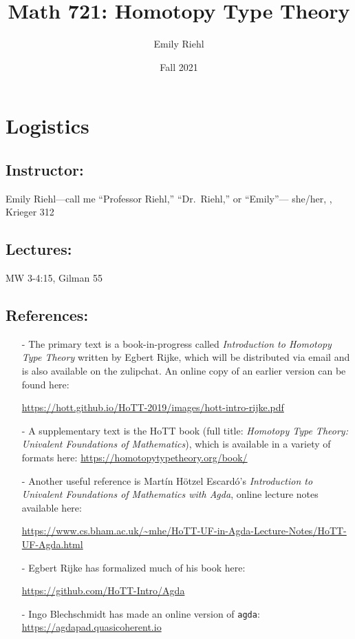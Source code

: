 \documentclass{amsart}
\title{Math 721: Homotopy Type Theory}
\author{Emily Riehl}
\theoremstyle{definition}
\theoremstyle{remark}
\numberwithin{equation}{section}
\begin{document}
\date{Fall 2021}


\address{Dept.~of Mathematics\\Johns Hopkins Univ.\\ 3400 N.~Charles Street \\ Baltimore, MD 21218}


\maketitle


\section*{Logistics}

\subsection*{Instructor:} 
 Emily Riehl---call me ``Professor Riehl,'' ``Dr.~Riehl,'' or ``Emily''--- she/her, , Krieger 312


 \subsection*{Lectures:}   MW 3-4:15, Gilman 55
\subsection*{References:} 
\begin{itemize}
\item[-] The primary text is a book-in-progress called \emph{Introduction to Homotopy Type Theory} written by Egbert Rijke, which will be distributed via email and is also available on the zulipchat. An online copy of an earlier version can be found here: \begin{flushright} \url{https://hott.github.io/HoTT-2019/images/hott-intro-rijke.pdf}\end{flushright}
\item[-] A supplementary text is the HoTT book (full title: \emph{Homotopy Type Theory: Univalent Foundations of Mathematics}), which is available in a variety of formats here: \hfill \url{https://homotopytypetheory.org/book/}
\item[-] Another useful reference is Mart\'{i}n H\"{o}tzel Escard\'{o}'s \emph{Introduction to Univalent Foundations of Mathematics with Agda}, online lecture notes available here: \begin{flushright}\url{https://www.cs.bham.ac.uk/~mhe/HoTT-UF-in-Agda-Lecture-Notes/HoTT-UF-Agda.html}\end{flushright}
\item[-] Egbert Rijke has formalized much of his book here: \begin{flushright} \url{https://github.com/HoTT-Intro/Agda} \end{flushright}
\item[-] Ingo Blechschmidt has made an online version of \texttt{agda}: \hfill \url{https://agdapad.quasicoherent.io} 
\end{itemize}
\end{document}
